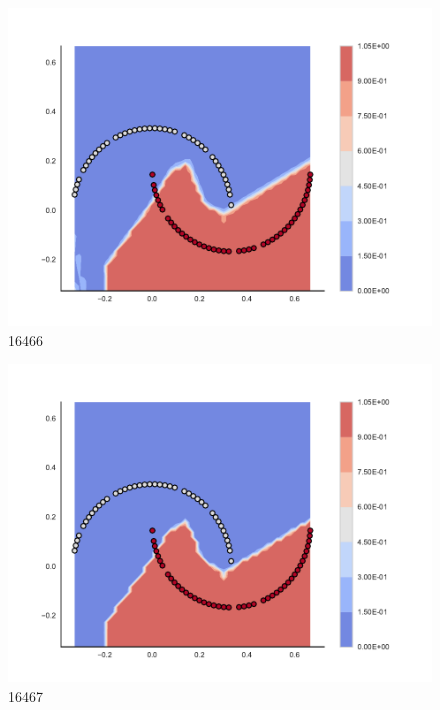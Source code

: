 \begin{subfigure}[b]{0.09\textwidth}
    \includegraphics[clip, trim=2.35cm 1.75cm 4.5cm 0cm,width=\textwidth]{img/convergence/16466.pdf}
    \caption{16466}
    \label{fig:convergence_16466}
\end{subfigure}
%
\begin{subfigure}[b]{0.09\textwidth}
    \includegraphics[clip, trim=2.35cm 1.75cm 4.5cm 0cm,width=\textwidth]{img/convergence/16467.pdf}
    \caption{16467}
    \label{fig:convergence_16467}
\end{subfigure}
%

